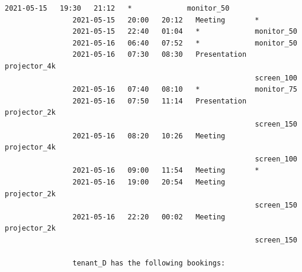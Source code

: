 \documentclass{article}
\begin{document}
\begin{Verbatim}[gobble=8]
                2021-05-15   19:30   21:12   *             monitor_50
                2021-05-15   20:00   20:12   Meeting       *
                2021-05-15   22:40   01:04   *             monitor_50
                2021-05-16   06:40   07:52   *             monitor_50
                2021-05-16   07:30   08:30   Presentation  projector_4k
                                                           screen_100
                2021-05-16   07:40   08:10   *             monitor_75
                2021-05-16   07:50   11:14   Presentation  projector_2k
                                                           screen_150
                2021-05-16   08:20   10:26   Meeting       projector_4k
                                                           screen_100
                2021-05-16   09:00   11:54   Meeting       *
                2021-05-16   19:00   20:54   Meeting       projector_2k
                                                           screen_150
                2021-05-16   22:20   00:02   Meeting       projector_2k
                                                           screen_150
                
                tenant_D has the following bookings:
                

\end{Verbatim}
\end{document}
